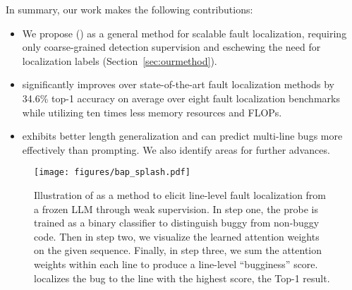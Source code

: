 In summary, our work makes the following contributions:
\begin{itemize}[itemsep=0pt, topsep=0pt]
    \item We propose \ourmethodlong{} (\ourmethod{}) as a general method for scalable fault localization, requiring only coarse-grained detection supervision and eschewing the need for localization labels (Section~\ref{sec:ourmethod}).
    \item
    \ourmethod{} significantly improves over state-of-the-art fault localization methods by 34.6\% top-1 accuracy on average over eight fault localization benchmarks while utilizing ten times less memory resources and FLOPs.
    \item \ourmethod{} exhibits better length generalization and can predict multi-line bugs more effectively than prompting.  We also identify areas for further advances.
\end{itemize}

\begin{figure*}
    \centering
    \texttt{[image: figures/bap\_splash.pdf]}
    \caption{Illustration of \ourmethod{} as a method to elicit line-level fault localization from a frozen LLM through weak supervision. In step one, the probe is trained as a binary classifier to distinguish buggy from non-buggy code. Then in step two, we visualize the learned attention weights on the given sequence. Finally, in step three, we sum the attention weights within each line to produce a line-level ``bugginess'' score. \ourmethod{} localizes the bug to the line with the highest score, the Top-1 result.}
    \label{fig:overview}
\end{figure*}